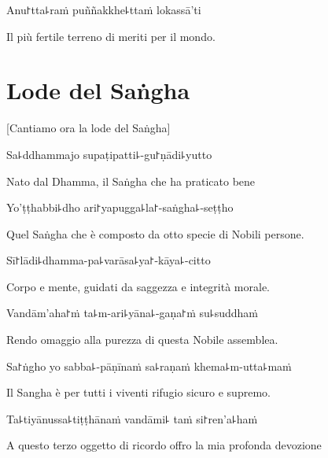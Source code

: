 Anu꜓tta꜕raṁ puññakkhe꜕ttaṁ lokassā'ti
\begin{english}
Il più fertile terreno di meriti per il mondo.
\end{english}

\chapter*{Lode del Saṅgha}

\begin{leader}
\end{leader}

\begin{english}
[Cantiamo ora la lode del Saṅgha]
\end{english}

Sa꜕ddhammajo supaṭipatti꜕-gu꜓ṇādi꜕yutto\\
\begin{english}
Nato dal Dhamma, il Saṅgha che ha praticato bene\\
\end{english}

Yo'ṭṭhabbi꜕dho ari꜓yapugga꜕la꜓-saṅgha꜕-seṭṭho\\
\begin{english}
Quel Saṅgha che è composto da otto specie di Nobili persone.\\
\end{english}


Sī꜓lādi꜕dhamma-pa꜕varāsa꜕ya꜓-kāya꜕-citto\\
\begin{english}
Corpo e mente, guidati da saggezza e integrità morale.\\
\end{english}


Vandām'aha꜓ṁ ta꜕m-ari꜕yāna꜕-gaṇa꜓ṁ su꜕suddhaṁ\\
\begin{english}
Rendo omaggio alla purezza di questa Nobile assemblea.\\
\end{english}   

Sa꜓ṅgho yo sabba꜕-pāṇīnaṁ sa꜕raṇaṁ khema꜕m-utta꜕maṁ\\
\begin{english}
Il Sangha è per tutti i viventi rifugio sicuro e supremo.\\
\end{english}

Ta꜕tiyānussa꜕tiṭṭhānaṁ vandāmi꜕ taṁ si꜓ren'a꜕haṁ
\begin{english}
A questo terzo oggetto di ricordo offro la mia profonda devozione\\
\end{english}

